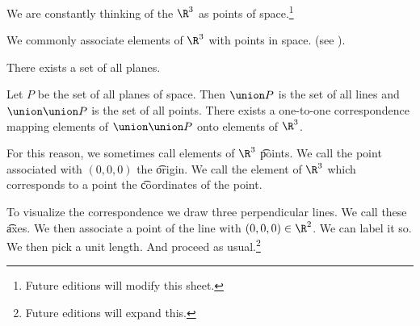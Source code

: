 

We are constantly thinking of the $\R^3$ as points of space.\footnote{Future editions will modify this sheet.}


We commonly associate elements of $\R^3$ with points in space. (see ).

\begin{principle}
  There exists a set of all planes.
\end{principle}

\begin{principle}
  Let $P$ be the set of all planes of space.
  Then $\union P$ is the set of all lines and $\union \union P$ is the set of all points.
  There exists a one-to-one correspondence mapping elements of $\union \union P$ onto elements of $\R^3$.
\end{principle}
For this reason, we sometimes call elements of $\R^3$ \t{points}.
We call the point associated with $(0, 0, 0)$ the \t{origin}.
We call the element of $\R^3$ which corresponds to a point the \t{coordinates} of the point.


To visualize the correspondence we draw three perpendicular lines.
We call these \t{axes}.
We then associate a point of the line with $(0, 0, 0) \in \R^2$.
We can label it so.
We then pick a unit length.
And proceed as usual.\footnote{Future editions will expand this.}

\blankpage
